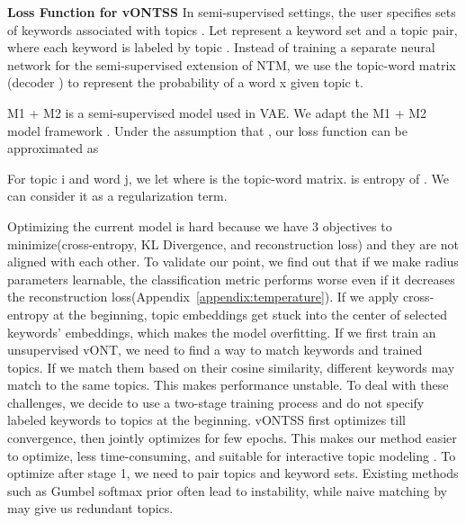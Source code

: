 \documentclass[11pt]{article}
\begin{document}
\textbf{Loss Function for vONTSS}
In semi-supervised settings, the user specifies sets of keywords  associated with topics . Let  represent a keyword set and a topic pair, where each keyword  is labeled by topic . Instead of training a separate neural network for the semi-supervised extension of NTM, we use the topic-word matrix (decoder ) to represent the probability of a word x given topic t. 




M1 + M2 is a semi-supervised model used in VAE. We adapt the M1 + M2 model framework \cite{kingma2014semi}. 
Under the assumption that , our loss function can be approximated as  
 




For topic i and word j, we let  where  is the topic-word matrix.  is entropy of . We can consider it as a regularization term. 

Optimizing the current model is hard because we have 3 objectives to minimize(cross-entropy, KL Divergence, and reconstruction loss) and they are not aligned with each other. To validate our point, we find out that if we make radius parameters learnable, the classification metric performs worse even if it decreases the reconstruction loss(Appendix~\ref{appendix:temperature}). If we apply cross-entropy at the beginning, topic embeddings get stuck into the center of selected keywords' embeddings, which makes the model overfitting. If we first train an unsupervised vONT, we need to find a way to match keywords and trained topics. If we match them based on their cosine similarity, different keywords may match to the same topics. This makes performance unstable. 
To deal with these challenges, we decide to use a two-stage training process and do not specify labeled keywords to topics at the beginning. vONTSS first optimizes  till convergence, then jointly optimizes  for few epochs. This makes our method easier to optimize, less time-consuming, and suitable for interactive topic modeling \cite{hu2014interactive}. To optimize  after stage 1, we need to pair topics and keyword sets. Existing methods such as Gumbel softmax prior \cite{jang2016categorical} often lead to instability, while naive matching by  may give us redundant topics.
\end{document}
